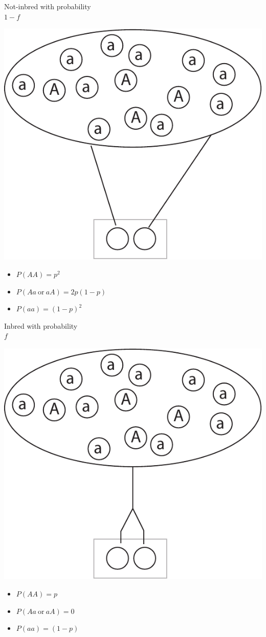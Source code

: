 \enlargethispage*{1000pt}
\begin{minipage}[c]{.45\textwidth}
\begin{center}
Not-inbred with probability \\
$1-f$

\includegraphics[width=.8\textwidth]{illus/SimpleNotInbreeding.pdf}
\end{center}
\begin{itemize}
\small
\item $P(AA) = p^2$
\item $P(Aa~\mathrm{or}~aA) = 2p(1-p)$
\item $P(aa) = (1-p)^2$
\end{itemize}

\end{minipage}
\hfill
\begin{minipage}[c]{.45\textwidth}
\begin{center}
Inbred with probability \\
$f$

\includegraphics[width=.8\textwidth]{illus/SimpleInbreeding.pdf}
\end{center}
\begin{itemize}
\small
\item $P(AA) = p $
\item $P(Aa~\mathrm{or}~aA) = 0$
\item $P(aa) = (1-p)$
\end{itemize}
\end{minipage}

